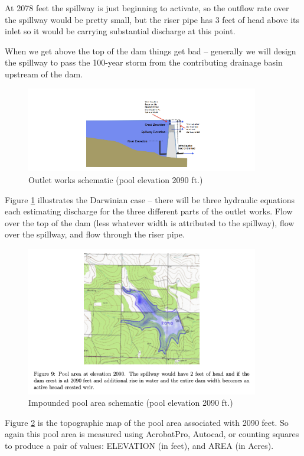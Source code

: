 \documentclass[12pt]{article}
\begin{document}
At 2078 feet the spillway is just beginning to activate, so the outflow rate over the spillway would be pretty small, but the riser pipe has 3 feet of head above its inlet so it would be carrying substantial discharge at this point.

When we get above the top of the dam things get bad – generally we will design the spillway to pass the 100-year storm from the contributing drainage basin upstream of the dam.

\begin{figure}[h!] %
   \centering
   \includegraphics[width=4.0in]{fig8.png} 
   \caption{Outlet works schematic (pool elevation 2090 ft.)}
   \label{fig:fig8}
\end{figure}

Figure \ref{fig:fig8} illustrates the Darwinian case – there will be three hydraulic equations each estimating discharge for the three different parts of the outlet works. Flow over the top of the dam (less whatever width is attributed to the spillway), flow over the spillway, and flow through the riser pipe.


\begin{figure}[h!] %
   \centering
   \includegraphics[width=4.0in]{fig9.png} 
   \caption{Impounded pool area schematic (pool elevation 2090 ft.)}
   \label{fig:fig9}
\end{figure}

Figure \ref{fig:fig9} is the topographic map of the pool area associated with 2090 feet. So again this pool area is measured using AcrobatPro, Autocad, or counting squares to produce a pair of values: ELEVATION (in feet), and AREA (in Acres).
\end{document}
